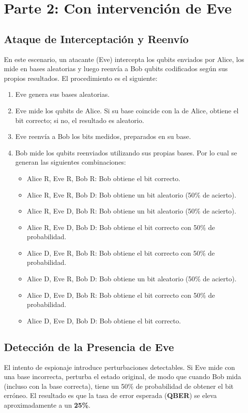 \documentclass[12pt]{article}
\begin{document}
\section{Parte 2: Con intervención de Eve}
\subsection{Ataque de Interceptación y Reenvío}
En este escenario, un atacante (Eve) intercepta los qubits enviados por Alice, los mide en bases aleatorias y luego reenvía a Bob qubits codificados según sus propios resultados. 
El procedimiento es el siguiente:

\begin{enumerate}
    \item Eve genera sus bases aleatorias.
    \item Eve mide los qubits de Alice. Si su base coincide con la de Alice, obtiene el bit correcto; si no, el resultado es aleatorio.
    \item Eve reenvía a Bob los bits medidos, preparados en su base.
    \item Bob mide los qubits reenviados utilizando sus propias bases. Por lo cual se generan las siguientes combinaciones:
    \begin{itemize}
        \item Alice R, Eve R, Bob R: Bob obtiene el bit correcto.
        \item Alice R, Eve R, Bob D: Bob obtiene un bit aleatorio (50\% de acierto).
        \item Alice R, Eve D, Bob R: Bob obtiene un bit aleatorio (50\% de acierto).
        \item Alice R, Eve D, Bob D: Bob obtiene el bit correcto con 50\% de probabilidad.
        \item Alice D, Eve R, Bob R: Bob obtiene el bit correcto con 50\% de probabilidad. %
        \item Alice D, Eve R, Bob D: Bob obtiene un bit aleatorio (50\% de acierto).
        \item Alice D, Eve D, Bob R: Bob obtiene el bit correcto con 50\% de probabilidad.
        \item Alice D, Eve D, Bob D: Bob obtiene el bit correcto.
    \end{itemize}
\end{enumerate}

\subsection{Detección de la Presencia de Eve}
El intento de espionaje introduce perturbaciones detectables. Si Eve mide con una base incorrecta, perturba el estado original, 
de modo que cuando Bob mida (incluso con la base correcta), tiene un 50\% de probabilidad de obtener el bit erróneo.
El resultado es que la tasa de error esperada (\textbf{QBER}) se eleva aproximadamente a un \textbf{25\%}.
\end{document}
